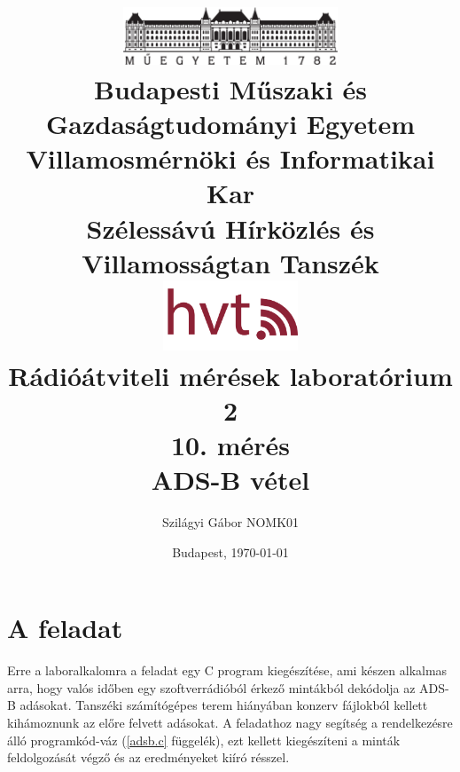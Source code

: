 \frenchspacing
\pagestyle{plain} 


\title{
    \centering
    \includegraphics[width=0.48\textwidth]{kep/bme_logo.pdf} \\
    \vspace{0.5cm}
    \large{\bf Budapesti Műszaki és Gazdaságtudományi Egyetem \\
    Villamosmérnöki és Informatikai Kar \\
    Szélessávú Hírközlés és Villamosságtan Tanszék}\\
    \vspace{0.5cm}
    \includegraphics[width=0.3\textwidth]{kep/hvt_logo.png} \\
    \vspace{3cm}
    \large{Rádióátviteli mérések laboratórium 2} \\
    \vspace{2cm}
    \Large{\bf{10. mérés\\ADS-B vétel}} \\
    \vspace{2cm}
}



\author{Szilágyi Gábor \hspace{1cm} NOMK01}
\date{Budapest, \today}



%
\maketitle
\setcounter{page}{2}
\section{A feladat}
    Erre a laboralkalomra a feladat egy C program kiegészítése, ami készen alkalmas arra, hogy valós időben egy szoftverrádióból érkező mintákból dekódolja az ADS-B adásokat. Tanszéki számítógépes terem hiányában konzerv fájlokból kellett kihámoznunk az előre felvett adásokat. A feladathoz nagy segítség a rendelkezésre álló programkód-váz (\ref{adsb.c} függelék), ezt kellett kiegészíteni a minták feldolgozását végző és az eredményeket kiíró résszel.
